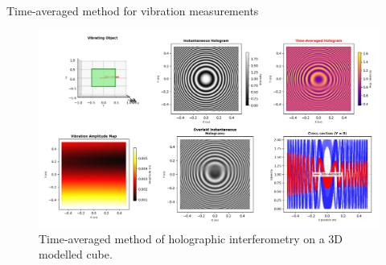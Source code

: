 \documentclass{beamer}
\begin{document}
\begin{frame}{Time-averaged method for vibration measurements}
    \begin{figure}[h]
        \centering
        \includegraphics[width=1\textwidth]{Figures/cube-vibration.png}
        \caption{Time-averaged method of holographic interferometry on a 3D modelled cube.}
        \label{fig:vibration_holography}
    \end{figure}
\end{frame}
\end{document}
